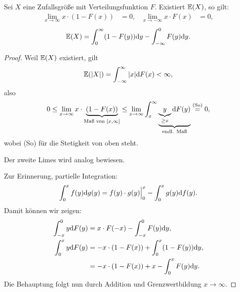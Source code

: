 \begin{thm}
  Sei $X$ eine Zufallsgröße mit Verteilungsfunktion $F$. Existiert $\mathbb{E}(X)$, so
  gilt:
  \begin{align*}
    \lim_{x \to \infty} x \cdot ( 1 - F(x) ) &= 0, & \lim_{x \to -\infty} x \cdot F(x) &= 0,
  \end{align*}
  \[ \mathbb{E}(X) = \int_0^\infty (1-F(y)) \mathrm{d} y - \int_{-\infty}^0 F(y) \mathrm{d}
    y. \]
\end{thm}

\begin{proof}
  Weil $\mathbb{E}(X)$ existiert, gilt
  \[ \mathbb{E}(|X|) = \int_{-\infty}^\infty |x| \mathrm{d} F(x) < \infty, \]
  also
  \[ 0 \le \lim_{x \to \infty} x \cdot
    \underbrace{(1-F(x))}_{\text{Maß von } [x, \infty]}
    \le \lim_{x \to \infty} \int_x^\infty
    \underbrace{\underbrace{y}_{\ge x} \mathrm{d} F(y)}_{\text{endl. Maß}}
    \overset{\text{(So)}}{=} 0,
  \]
  wobei (So) für die Stetigkeit von oben steht.

  Der zweite Limes wird analog bewiesen.

  Zur Erinnerung, partielle Integration:
  \[ \int_0^x f(y) \mathrm{d} g(y) = f(y) \cdot g(y) \Big|_0^x - \int_0^x g(y)
    \mathrm{d} f(y). \]
  Damit können wir zeigen:
  \begin{align*}
    \int_{-x}^0 y \mathrm{d} F(y) &= x \cdot F(-x) - \int_{-x}^0 F(y) \mathrm{d} y, \\
    \int_0^x y \mathrm{d} F(y) &= -x \cdot(1-F(x)) + \int_0^x (1-F(y)) \mathrm{d} y, \\
                               &= -x \cdot(1-F(x)) + x - \int_0^x F(y) \mathrm{d} y.
  \end{align*}
  Die Behauptung folgt nun durch Addition und Grenzwertbildung $x \to \infty$.
\end{proof}


